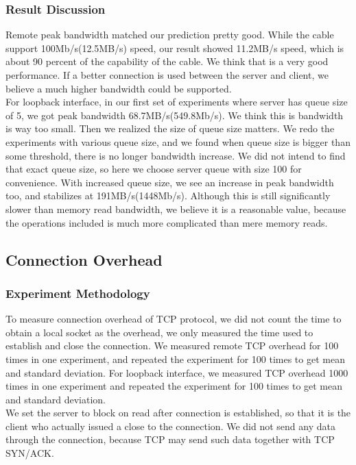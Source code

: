 \documentclass{article} %
\begin{document}
\subsubsection{Result Discussion}
Remote peak bandwidth matched our prediction pretty good. While the cable support 100Mb/s(12.5MB/s) speed, our result showed 11.2MB/s speed, which is about 90 percent of the capability of the cable. We think that is a very good performance. If a better connection is used between the server and client, we believe a much higher bandwidth could be supported. \\
For loopback interface, in our first set of experiments where server has queue size of 5, we got peak bandwidth 68.7MB/s(549.8Mb/s). We think this is bandwidth is way too small. Then we realized the size of queue size matters. We redo the experiments with various queue size, and we found when queue size is bigger than some threshold, there is no longer bandwidth increase. We did not intend to find that exact queue size, so here we choose server queue with size 100 for convenience. With increased queue size, we see an increase in peak bandwidth too, and stabilizes at 191MB/s(1448Mb/s). Although this is still significantly slower than memory read bandwidth, we believe it is a reasonable value, because the operations included is much more complicated than mere memory reads. \\

\subsection{Connection Overhead}
\subsubsection{Experiment Methodology}
To measure connection overhead of TCP protocol, we did not count the time to obtain a local socket as the overhead, we only measured the time used to establish and close the connection. We measured remote TCP overhead for 100 times in one experiment, and repeated the experiment for 100 times to get mean and standard deviation. For loopback interface, we measured TCP overhead 1000 times in one experiment and repeated the experiment for 100 times to get mean and standard deviation. \\
We set the server to block on read after connection is established, so that it is the client who actually issued a close to the connection. We did not send any data through the connection, because TCP may send such data together with TCP SYN/ACK.\\
\end{document}
